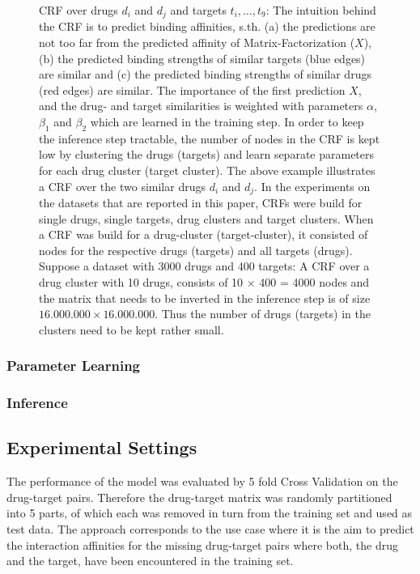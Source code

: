 \documentclass[
journal=jacsat, %
manuscript=article]{achemso}
\begin{document}
\begin{figure}
\caption{CRF over drugs $d_i$ and $d_j$ and targets $t_i,\dots,t_9$:  The intuition behind the CRF is to predict binding affinities, s.th. (a) the predictions are not too far from the predicted affinity of Matrix-Factorization ($X$), (b) the predicted binding strengths of similar targets (blue edges) are similar and (c) the predicted  binding strengths of similar drugs (red edges) are similar. The importance of the first prediction $X$, and the drug- and target similarities is weighted with parameters $\alpha$, $\beta_1$ and $\beta_2$ which are learned in the training step. In order to keep the inference step tractable, the number of nodes in the CRF is kept low by clustering the drugs (targets) and learn separate parameters for each drug cluster (target cluster). The above example illustrates a CRF over the two similar drugs $d_i$ and $d_j$. In the experiments on the datasets that are reported in this paper, CRFs were build for single drugs, single targets, drug clusters and target clusters. When a CRF was build for a drug-cluster (target-cluster), it consisted of nodes for the respective drugs (targets) and all targets (drugs). Suppose a dataset with 3000 drugs and 400 targets: A CRF over a drug cluster with 10 drugs, consists of 10 $\times$ 400  = 4000 nodes and the matrix that needs to be inverted in the inference step is of size $16.000.000 \times 16.000.000$. Thus the number of drugs (targets) in the clusters need to be kept rather small.
}
\end{figure}

\subsubsection{Parameter Learning}

\subsubsection{Inference}

\subsection{Experimental Settings}
The performance of the model was evaluated by 5 fold Cross Validation on the drug-target pairs. Therefore the drug-target matrix was randomly partitioned into 5 parts, of which each was removed in turn from the training set and used as test data. The approach corresponds to the use case where it is the aim to predict the interaction affinities for the missing drug-target pairs where both, the drug and the target, have been encountered in the training set. 
\end{document}
